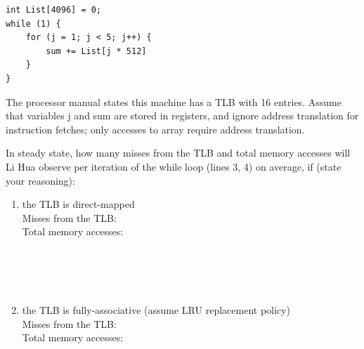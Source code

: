 \documentclass[addpoints, 12pt, answers]{exam}
\begin{document}
\begin{questions}
\begin{parts}
\begin{lstlisting}
int List[4096] = 0;
while (1) {
	for (j = 1; j < 5; j++) {
		sum += List[j * 512]
	}
}
\end{lstlisting}


The processor manual states this machine has a TLB with 16 entries. Assume that variables j and sum are stored in registers, and ignore address translation for instruction fetches; only accesses to array require address translation.

In steady state, how many misses from the TLB and total memory accesses will Li Hua observe per iteration of the while loop (lines 3, 4) on average, if (state your reasoning):


\begin{enumerate}
	\item the TLB is direct-mapped \\
	
	Misses from the TLB:\underline{\quad\quad\quad\quad\quad\quad\quad\quad\quad}\\

	Total memory accesses:\underline{\quad\quad\quad\quad\quad\quad\quad\quad\quad}\\

	\quad\\\quad\\\quad\\\quad\\\quad

	\item the TLB is fully-associative (assume LRU replacement policy) \\
	
	Misses from the TLB:\underline{\quad\quad\quad\quad\quad\quad\quad\quad\quad}\\

	Total memory accesses:\underline{\quad\quad\quad\quad\quad\quad\quad\quad\quad}\\

	\quad\\\quad\\\quad\\\quad\\\quad

\end{enumerate}




\end{parts}




\end{questions}
\end{document}
